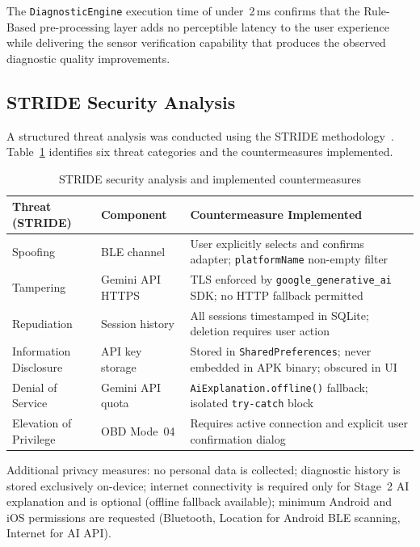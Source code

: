 The \texttt{DiagnosticEngine} execution time of under~2\,ms confirms that the Rule-Based pre-processing layer adds no perceptible latency to the user experience while delivering the sensor verification capability that produces the observed diagnostic quality improvements.

\subsection{STRIDE Security Analysis}

A structured threat analysis was conducted using the STRIDE methodology~\cite{martin2017}.
Table~\ref{tab:stride} identifies six threat categories and the countermeasures implemented.

\begin{table}[!htbp]
\centering
\caption{STRIDE security analysis and implemented countermeasures}
\label{tab:stride}
\begin{tabularx}{0.98\linewidth}{p{2.8cm} p{2.4cm} X}
\toprule
\rowcolor{tblhdr}
\color{white}\textbf{Threat (STRIDE)} &
\color{white}\textbf{Component} &
\color{white}\textbf{Countermeasure Implemented} \\
\midrule
Spoofing              & BLE channel     & User explicitly selects and confirms adapter; \texttt{platformName} non-empty filter \\
Tampering             & Gemini API HTTPS & TLS enforced by \texttt{google\_generative\_ai} SDK; no HTTP fallback permitted \\
Repudiation           & Session history & All sessions timestamped in SQLite; deletion requires user action \\
Information Disclosure & API key storage & Stored in \texttt{SharedPreferences}; never embedded in APK binary; obscured in UI \\
Denial of Service     & Gemini API quota & \texttt{AiExplanation.offline()} fallback; isolated \texttt{try-catch} block \\
Elevation of Privilege & OBD Mode~04    & Requires active connection and explicit user confirmation dialog \\
\bottomrule
\end{tabularx}
\end{table}

Additional privacy measures: no personal data is collected; diagnostic history is stored exclusively on-device; internet connectivity is required only for Stage~2 AI explanation and is optional (offline fallback available); minimum Android and iOS permissions are requested (Bluetooth, Location for Android BLE scanning, Internet for AI API).

